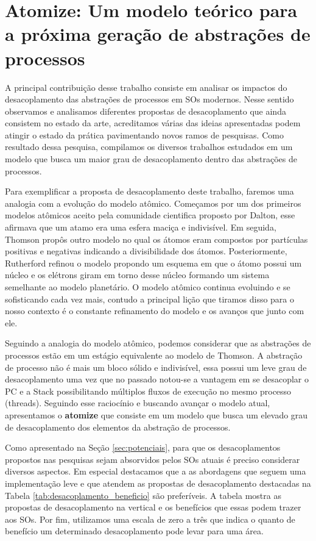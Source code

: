 \section{Atomize: Um modelo teórico para a próxima geração de abstrações de processos}

A principal contribuição desse trabalho consiste em analisar os impactos do
desacoplamento das abstrações de processos em SOs modernos. Nesse sentido
observamos e analisamos diferentes propostas de desacoplamento que ainda
consistem no estado da arte, acreditamos várias das ideias apresentadas podem
atingir o estado da prática pavimentando novos ramos de pesquisas. Como
resultado dessa pesquisa, compilamos os diversos trabalhos estudados em um
modelo que busca um maior grau de desacoplamento dentro das abstrações de
processos.

Para exemplificar a proposta de desacoplamento deste trabalho, faremos uma
analogia com a evolução do modelo atômico. Começamos por um dos primeiros
modelos atômicos aceito pela comunidade cientifica proposto por Dalton, esse
afirmava que um atamo era uma esfera maciça e indivisível. Em seguida, Thomson
propôs outro modelo no qual os átomos eram compostos por partículas positivas e
negativas indicando a divisibilidade dos átomos. Posteriormente, Rutherford
refinou o modelo propondo um esquema em que o átomo possui um núcleo e os
elétrons giram em torno desse núcleo formando um sistema semelhante ao modelo
planetário. O modelo atômico continua evoluindo e se sofisticando cada vez
mais, contudo a principal lição que tiramos disso para o nosso contexto é o
constante refinamento do modelo e os avanços que junto com ele.

Seguindo a analogia do modelo atômico, podemos considerar que as abstrações de
processos estão em um estágio equivalente ao modelo de Thomson. A abstração de
processo não é mais um bloco sólido e indivisível, essa possui um leve grau de
desacoplamento uma vez que no passado notou-se a vantagem em se desacoplar o PC
e a Stack possibilitando múltiplos fluxos de execução no mesmo processo
(threads). Seguindo esse raciocínio e buscando avançar o modelo atual,
apresentamos o \textbf{atomize} que consiste em um modelo que busca um elevado
grau de desacoplamento dos elementos da abstração de processos.

Como apresentado na Seção \ref{sec:potenciais}, para que os desacoplamentos
propostos nas pesquisas sejam absorvidos pelos SOs atuais é preciso considerar
diversos aspectos. Em especial destacamos que a as abordagens que seguem uma
implementação leve e que atendem as propostas de desacoplamento destacadas na
Tabela \ref{tab:desacoplamento_beneficio} são preferíveis. A tabela mostra as
propostas de desacoplamento na vertical e os benefícios que essas podem trazer
aos SOs. Por fim, utilizamos uma escala de zero a três  que indica o
quanto de benefício um determinado desacoplamento pode levar para uma área.

